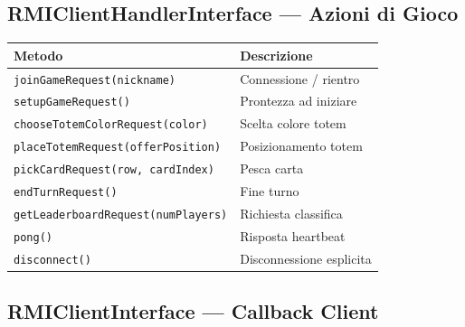 \documentclass[a4paper,12pt]{article}
\newcommand{\code}[1]{\texttt{#1}}
\begin{document}
\subsection{RMIClientHandlerInterface --- Azioni di Gioco}

\begin{small}
\begin{tabularx}{\textwidth}{@{}p{6cm}X@{}}
\toprule
\textbf{Metodo} & \textbf{Descrizione} \\
\midrule
\code{joinGameRequest(nickname)}         & Connessione / rientro \\
\code{setupGameRequest()}                & Prontezza ad iniziare \\
\code{chooseTotemColorRequest(color)}    & Scelta colore totem \\
\code{placeTotemRequest(offerPosition)}  & Posizionamento totem \\
\code{pickCardRequest(row, cardIndex)}   & Pesca carta \\
\code{endTurnRequest()}                  & Fine turno \\
\code{getLeaderboardRequest(numPlayers)} & Richiesta classifica \\
\code{pong()}                            & Risposta heartbeat \\
\code{disconnect()}                      & Disconnessione esplicita \\
\bottomrule
\end{tabularx}
\end{small}

\subsection{RMIClientInterface --- Callback Client}
\end{document}
